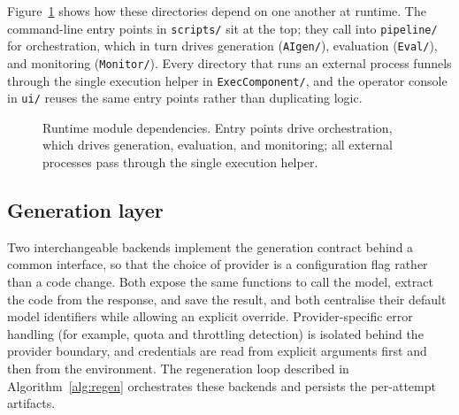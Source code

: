 Figure~\ref{fig:impl-modules} shows how these directories depend on one another at
runtime. The command-line entry points in \texttt{scripts/} sit at the top; they call
into \texttt{pipeline/} for orchestration, which in turn drives generation
(\texttt{AIgen/}), evaluation (\texttt{Eval/}), and monitoring (\texttt{Monitor/}). Every
directory that runs an external process funnels through the single execution helper in
\texttt{ExecComponent/}, and the operator console in \texttt{ui/} reuses the same entry
points rather than duplicating logic.

\begin{figure}[ht]
\centering
{}
\caption{Runtime module dependencies. Entry points drive orchestration, which drives
generation, evaluation, and monitoring; all external processes pass through the single
execution helper.}
\label{fig:impl-modules}
\end{figure}

\subsection{Generation layer}
\label{subsec:impl-generation}

Two interchangeable backends implement the generation contract behind a common
interface, so that the choice of provider is a configuration flag rather than a code
change. Both expose the same functions to call the model, extract the code from the
response, and save the result, and both centralise their default model identifiers while
allowing an explicit override. Provider-specific error handling (for example, quota and
throttling detection) is isolated behind the provider boundary, and credentials are read
from explicit arguments first and then from the environment. The regeneration loop
described in Algorithm~\ref{alg:regen} orchestrates these backends and persists the
per-attempt artifacts.

